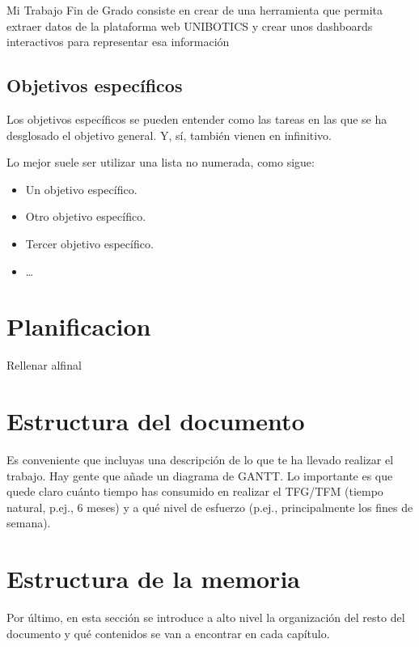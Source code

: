 \documentclass[a4paper, 12pt]{book}
\begin{document}
Mi Trabajo Fin de Grado consiste en crear de una herramienta que permita extraer datos de la plataforma web UNIBOTICS y crear unos dashboards interactivos para representar esa información


\subsection{Objetivos específicos}
\label{sec:objetivos-especificos}

Los objetivos específicos se pueden entender como las tareas en las que se ha desglosado el objetivo general. Y, sí, también vienen en infinitivo.

Lo mejor suele ser utilizar una lista no numerada, como sigue:

\begin{itemize}
	\item Un objetivo específico.
	\item Otro objetivo específico.
	\item Tercer objetivo específico.
	\item \ldots
\end{itemize}

\section{Planificacion}
\label{sec:objetivos}

Rellenar alfinal

\section{Estructura del documento}
\label{sec:planificacion-temporal}

Es conveniente que incluyas una descripción de lo que te ha llevado realizar el trabajo.
Hay gente que añade un diagrama de GANTT.
Lo importante es que quede claro cuánto tiempo has consumido en realizar el TFG/TFM 
(tiempo natural, p.ej., 6 meses) y a qué nivel de esfuerzo (p.ej., principalmente los 
fines de semana).

\section{Estructura de la memoria}
\label{sec:estructura}

Por último, en esta sección se introduce a alto nivel la organización del resto del documento
y qué contenidos se van a encontrar en cada capítulo.
\end{document}
